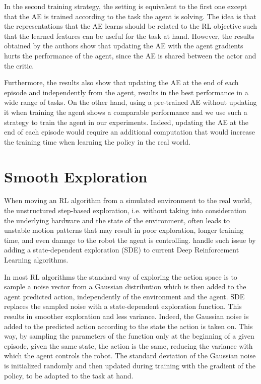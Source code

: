 In the second training strategy, the setting is equivalent to the first one except that the AE is trained according to the task the agent is solving. The idea is that the representations that the AE learns should be related to the RL objective such that the learned features can be useful for the task at hand. However, the results obtained by the authors show that updating the AE with the agent gradients hurts the performance of the agent, since the AE is shared between the actor and the critic.

Furthermore, the results also show that updating the AE at the end of each episode and independently from the agent, results in the best performance in a wide range of tasks. On the other hand, using a pre-trained AE without updating it when training the agent shows a comparable performance and we use such a strategy to train the agent in our experiments. Indeed, updating the AE at the end of each episode would require an additional computation that would increase the training time when learning the policy in the real world.

\section{Smooth Exploration}
When moving an RL algorithm from a simulated environment to the real world, the unstructured step-based exploration, i.e. without taking into consideration the underlying hardware and the state of the environment, often leads to unstable motion patterns that may result in poor exploration, longer training time, and even damage to the robot the agent is controlling. \citet{pmlr-v164-raffin22a} handle such issue by adding a state-dependent exploration (SDE) to current Deep Reinforcement Learning algorithms. 

In most RL algorithms the standard way of exploring the action space is to sample a noise vector from a Gaussian distribution which is then added to the agent predicted action, independently of the environment and the agent. SDE replaces the sampled noise with a state-dependent exploration function. This results in smoother exploration and less variance. Indeed, the Gaussian noise is added to the predicted action according to the state the action is taken on. This way, by sampling the parameters of the function only at the beginning of a given episode, given the same state, the action is the same, reducing the variance with which the agent controls the robot. The standard deviation of the Gaussian noise is initialized randomly and then updated during training with the gradient of the policy, to be adapted to the task at hand.

